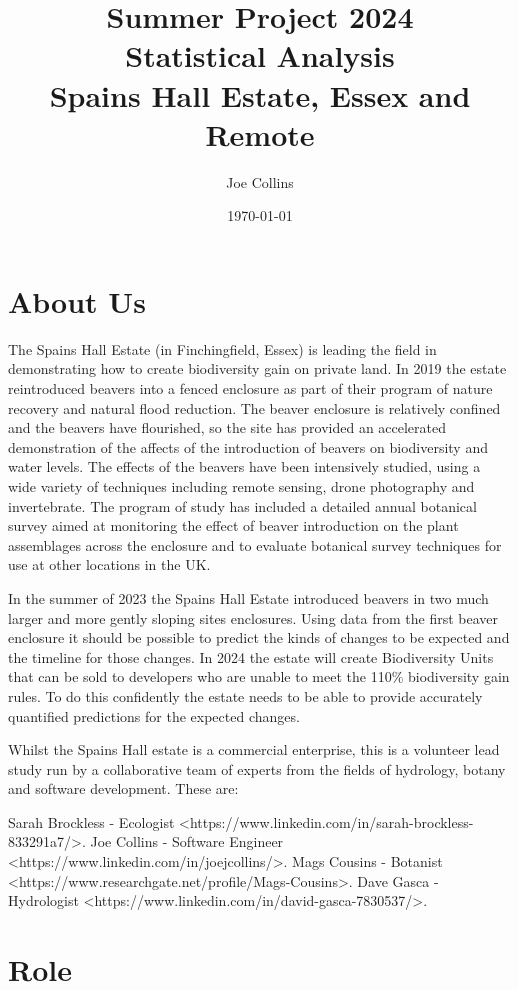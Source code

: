 \documentclass[10pt]{article}
\title{Summer Project 2024\\ Statistical Analysis \\
  \Large Spains Hall Estate, Essex and Remote}
\author{Joe Collins}
\date{\today}
\begin{document}
\maketitle

\section*{About Us}

The Spains Hall Estate
(in Finchingfield, Essex)
is leading the field in demonstrating
how to create biodiversity gain on private land.
In 2019 the estate reintroduced beavers into a fenced enclosure
as part of their program of nature recovery and natural flood reduction.
The beaver enclosure is relatively confined
and the beavers have flourished,
so the site has provided an accelerated demonstration of the affects of the introduction of beavers
on biodiversity and water levels.
The effects of the beavers have been intensively studied,
using a wide variety of techniques including remote sensing, drone photography and invertebrate.
The program of study has included a detailed annual botanical survey
aimed at monitoring the effect of beaver introduction on the plant assemblages across the enclosure
and to evaluate botanical survey techniques for use at other locations in the UK.

In the summer of 2023 the Spains Hall Estate
introduced beavers in two much larger and more gently sloping sites enclosures.
Using data from the first beaver enclosure
it should be possible to predict the kinds of changes to be expected and the timeline for those changes.
In 2024 the estate will create Biodiversity Units that can be sold to developers 
who are unable to meet the 110\% biodiversity gain rules.
To do this confidently the estate needs to be able to 
provide accurately quantified predictions for the expected changes.

Whilst the Spains Hall estate is a commercial enterprise,
this is a volunteer lead study
run by a collaborative team of experts from the fields of hydrology, botany and software development.
These are:

Sarah Brockless - Ecologist <https://www.linkedin.com/in/sarah-brockless-833291a7/>.
Joe Collins - Software Engineer <https://www.linkedin.com/in/joejcollins/>.
Mags Cousins - Botanist <https://www.researchgate.net/profile/Mags-Cousins>.
Dave Gasca - Hydrologist <https://www.linkedin.com/in/david-gasca-7830537/>.

\section*{Role}
\end{document}
